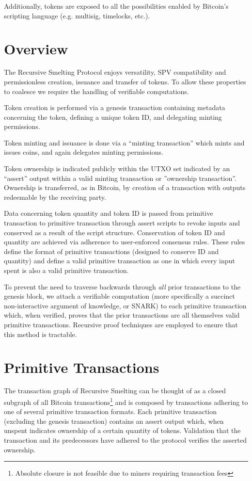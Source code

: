 \documentclass[9pt,oneside]{amsart}
\begin{document}
\begin{multicols}{2}
Additionally, tokens are exposed to all the possibilities enabled by Bitcoin's scripting language  (e.g. multisig, timelocks, etc.).

\section{Overview}
The Recursive Smelting Protocol enjoys versatility, SPV compatibility and permissionless creation, issuance and transfer of tokens. To allow these properties to coalesce we require the handling of verifiable computations.

Token creation is performed via a genesis transaction containing metadata concerning the token, defining a unique token ID, and delegating minting permissions.

Token minting and issuance is done via a ``minting transaction'' which mints and issues coins, and again delegates minting permissions.

Token ownership is indicated publicly within the UTXO set indicated by an ``assert'' output within a valid minting transaction or ''ownership transaction''. Ownership is transferred, as in Bitcoin, by creation of a transaction with outputs redeemable by the receiving party.


Data concerning token quantity and token ID is passed from primitive transaction to primitive transaction through assert scripts to revoke inputs and conserved as a result of the script structure. Conservation of token ID and quantity are achieved via adherence to user-enforced consensus rules. These rules define the format of primitive transactions (designed to conserve ID and quantity) and define a valid primitive transaction as one in which every input spent is also a valid primitive transaction.

To prevent the need to traverse backwards through \emph{all} prior transactions to the genesis block, we attach a verifiable computation (more specifically a succinct non-interactive argument of knowledge, or SNARK) to each primitive transaction which, when verified, proves that the prior transactions are all themselves valid primitive transactions. Recursive proof techniques are employed to ensure that this method is tractable. 

\section{Primitive Transactions}\label{sec:primtrans}
The transaction graph of Recursive Smelting can be thought of as a closed subgraph of all Bitcoin transactions\footnote{Absolute closure is not feasible due to miners requiring transaction fees} and is composed by transactions adhering to one of several primitive transaction formats. Each primitive transaction (excluding the genesis transaction) contains an assert output which, when unspent indicates ownership of a certain quantity of tokens. Validation that the transaction and its predecessors have adhered to the protocol verifies the asserted ownership. 


\end{multicols}
\end{document}

